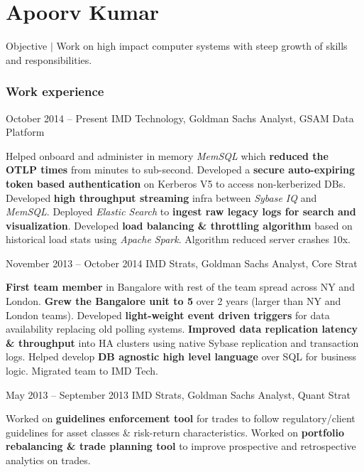 \documentclass{tccv}
\begin{document}
\part{Apoorv Kumar}
	 {\selectfont\large Objective $\vert$ \selectfont\large Work on high impact computer systems with steep growth of skills and responsibilities.}
     
\section{Work experience}

\begin{eventlist}

\item{October 2014 -- Present}
     {IMD Technology, Goldman Sachs}
     {Analyst, GSAM Data Platform}


Helped onboard and administer in memory \textit{MemSQL} which \textbf{reduced
the OTLP times} from minutes to sub-second. Developed a \textbf{secure auto-expiring token based authentication} on Kerberos V5 to access non-kerberized DBs. Developed \textbf{high throughput streaming} infra between \textit{Sybase IQ} and \textit{MemSQL}. Deployed \textit{Elastic Search} to \textbf{ingest raw legacy logs for search and visualization}. Developed \textbf{load balancing \& throttling algorithm} based on historical load stats using \textit{Apache Spark}. Algorithm reduced server crashes 10x.

\item{November 2013 -- October 2014}
     {IMD Strats, Goldman Sachs}
     {Analyst, Core Strat}

\textbf{First team member} in Bangalore with rest of the team spread across NY and London. \textbf{Grew the Bangalore unit to 5} over 2 years (larger than NY and London teams). Developed \textbf{light-weight event driven triggers} for data availability replacing old polling systems. \textbf{Improved data replication latency \& throughput} into HA clusters using native Sybase replication and transaction logs. Helped develop \textbf{DB agnostic high level language} over SQL for business logic.
Migrated team to IMD Tech.

\item{May 2013 -- September 2013}
     {IMD Strats, Goldman Sachs}
     {Analyst, Quant Strat}

Worked on \textbf{guidelines enforcement tool} for trades to follow regulatory/client guidelines for asset classes \& risk-return characteristics. Worked on \textbf{portfolio rebalancing \& trade planning tool} to improve prospective and retrospective analytics on trades. 


\end{eventlist}
\end{document}
